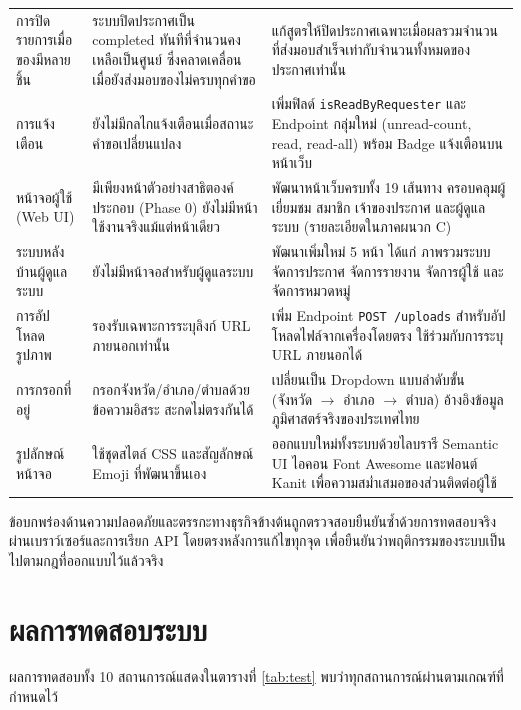 \documentclass[12pt,a4paper]{report}
\begin{document}
{\begin{longtable}{>{\raggedright\arraybackslash}p{2.6cm} >{\raggedright\arraybackslash}p{6.0cm} >{\raggedright\arraybackslash}p{6.0cm}}
การปิดรายการเมื่อของมีหลายชิ้น &
ระบบปิดประกาศเป็น completed ทันทีที่จำนวนคงเหลือเป็นศูนย์ ซึ่งคลาดเคลื่อนเมื่อยังส่งมอบของไม่ครบทุกคำขอ &
แก้สูตรให้ปิดประกาศเฉพาะเมื่อผลรวมจำนวนที่ส่งมอบสำเร็จเท่ากับจำนวนทั้งหมดของประกาศเท่านั้น\\
การแจ้งเตือน &
ยังไม่มีกลไกแจ้งเตือนเมื่อสถานะคำขอเปลี่ยนแปลง &
เพิ่มฟิลด์ \texttt{isReadByRequester} และ Endpoint กลุ่มใหม่ (unread-count, read, read-all) พร้อม Badge แจ้งเตือนบนหน้าเว็บ\\
หน้าจอผู้ใช้ (Web UI) &
มีเพียงหน้าตัวอย่างสาธิตองค์ประกอบ (Phase 0) ยังไม่มีหน้าใช้งานจริงแม้แต่หน้าเดียว &
พัฒนาหน้าเว็บครบทั้ง 19 เส้นทาง ครอบคลุมผู้เยี่ยมชม สมาชิก เจ้าของประกาศ และผู้ดูแลระบบ (รายละเอียดในภาคผนวก C)\\
ระบบหลังบ้านผู้ดูแลระบบ &
ยังไม่มีหน้าจอสำหรับผู้ดูแลระบบ &
พัฒนาเพิ่มใหม่ 5 หน้า ได้แก่ ภาพรวมระบบ จัดการประกาศ จัดการรายงาน จัดการผู้ใช้ และจัดการหมวดหมู่\\
การอัปโหลดรูปภาพ &
รองรับเฉพาะการระบุลิงก์ URL ภายนอกเท่านั้น &
เพิ่ม Endpoint \texttt{POST /uploads} สำหรับอัปโหลดไฟล์จากเครื่องโดยตรง ใช้ร่วมกับการระบุ URL ภายนอกได้\\
การกรอกที่อยู่ &
กรอกจังหวัด/อำเภอ/ตำบลด้วยข้อความอิสระ สะกดไม่ตรงกันได้ &
เปลี่ยนเป็น Dropdown แบบลำดับขั้น (จังหวัด $\to$ อำเภอ $\to$ ตำบล) อ้างอิงข้อมูลภูมิศาสตร์จริงของประเทศไทย\\
รูปลักษณ์หน้าจอ &
ใช้ชุดสไตล์ CSS และสัญลักษณ์ Emoji ที่พัฒนาขึ้นเอง &
ออกแบบใหม่ทั้งระบบด้วยไลบรารี Semantic UI ไอคอน Font Awesome และฟอนต์ Kanit เพื่อความสม่ำเสมอของส่วนติดต่อผู้ใช้\\
\end{longtable}
}

ข้อบกพร่องด้านความปลอดภัยและตรรกะทางธุรกิจข้างต้นถูกตรวจสอบยืนยันซ้ำด้วยการทดสอบจริงผ่านเบราว์เซอร์และการเรียก API โดยตรงหลังการแก้ไขทุกจุด เพื่อยืนยันว่าพฤติกรรมของระบบเป็นไปตามกฎที่ออกแบบไว้แล้วจริง

\section{ผลการทดสอบระบบ}

ผลการทดสอบทั้ง 10 สถานการณ์แสดงในตารางที่ \ref{tab:test} พบว่าทุกสถานการณ์ผ่านตามเกณฑ์ที่กำหนดไว้
\end{document}
